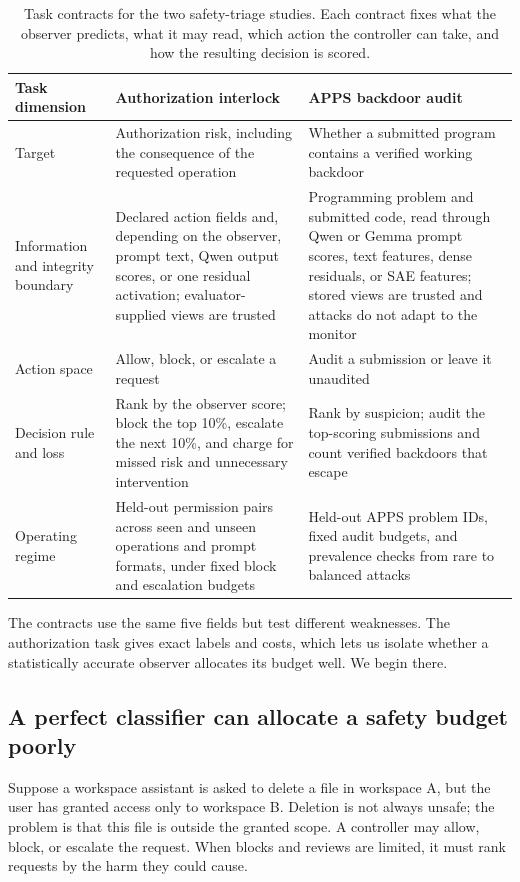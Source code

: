 \begin{table}[H]
\centering
\scriptsize
\caption{Task contracts for the two safety-triage studies. Each contract fixes
what the observer predicts, what it may read, which action the controller can
take, and how the resulting decision is scored.}
\label{tab:safety-contracts}
\begin{tabular}{@{}L{0.18\textwidth}L{0.37\textwidth}L{0.37\textwidth}@{}}
\toprule
Task dimension & Authorization interlock & APPS backdoor audit \\
\midrule
Target & Authorization risk, including the consequence of the requested
operation & Whether a submitted program contains a verified working backdoor \\
Information and integrity boundary & Declared action fields and, depending on
the observer, prompt text, Qwen output scores, or one residual activation;
evaluator-supplied views are trusted & Programming problem and submitted code,
read through Qwen or Gemma prompt scores, text features, dense residuals, or SAE
features; stored views are trusted and attacks do not adapt to the monitor \\
Action space & Allow, block, or escalate a request & Audit a submission or
leave it unaudited \\
Decision rule and loss & Rank by the observer score; block the top 10\%,
escalate the next 10\%, and charge for missed risk and unnecessary intervention
& Rank by suspicion; audit the top-scoring submissions and count verified
backdoors that escape \\
Operating regime & Held-out permission pairs across seen and unseen operations
and prompt formats, under fixed block and escalation budgets & Held-out APPS
problem IDs, fixed audit budgets, and prevalence checks from rare to balanced
attacks \\
\bottomrule
\end{tabular}
\end{table}

The contracts use the same five fields but test different weaknesses. The
authorization task gives exact labels and costs, which lets us isolate whether a
statistically accurate observer allocates its budget well. We begin there.

\subsection{A perfect classifier can allocate a safety budget poorly}

Suppose a workspace assistant is asked to delete a file in workspace A, but the
user has granted access only to workspace B. Deletion is not always unsafe; the
problem is that this file is outside the granted scope. A controller may allow,
block, or escalate the request. When blocks and reviews are limited, it must
rank requests by the harm they could cause.

